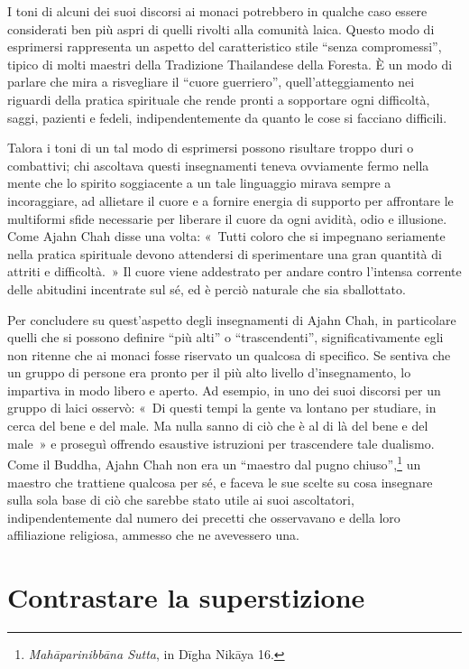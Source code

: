 I toni di alcuni dei suoi discorsi ai monaci potrebbero in qualche caso
essere considerati ben più aspri di quelli rivolti alla comunità laica.
Questo modo di esprimersi rappresenta un aspetto del caratteristico
stile ``senza compromessi'', tipico di molti maestri della Tradizione
Thailandese della Foresta. È un modo di parlare che mira a risvegliare
il ``cuore guerriero'', quell'atteggiamento nei riguardi della pratica
spirituale che rende pronti a sopportare ogni difficoltà, saggi,
pazienti e fedeli, indipendentemente da quanto le cose si facciano
difficili.

Talora i toni di un tal modo di esprimersi possono risultare troppo duri
o combattivi; chi ascoltava questi insegnamenti teneva ovviamente fermo
nella mente che lo spirito soggiacente a un tale linguaggio mirava
sempre a incoraggiare, ad allietare il cuore e a fornire energia di
supporto per affrontare le multiformi sfide necessarie per liberare il
cuore da ogni avidità, odio e illusione. Come Ajahn Chah disse una
volta: «~Tutti coloro che si impegnano seriamente nella pratica
spirituale devono attendersi di sperimentare una gran quantità di
attriti e difficoltà.~» Il cuore viene addestrato per andare contro
l'intensa corrente delle abitudini incentrate sul sé, ed è perciò
naturale che sia sballottato.

Per concludere su quest'aspetto degli insegnamenti di Ajahn Chah, in
particolare quelli che si possono definire ``più alti'' o
``trascendenti'', significativamente egli non ritenne che ai monaci
fosse riservato un qualcosa di specifico. Se sentiva che un gruppo di
persone era pronto per il più alto livello d'insegnamento, lo impartiva
in modo libero e aperto. Ad esempio, in uno dei suoi discorsi per un
gruppo di laici osservò: «~Di questi tempi la gente va lontano per
studiare, in cerca del bene e del male. Ma nulla sanno di ciò che è al
di là del bene e del male~» e proseguì offrendo esaustive istruzioni per
trascendere tale dualismo. Come il Buddha, Ajahn Chah non era un
``maestro dal pugno chiuso'',\footnote{\emph{Mahāparinibbāna Sutta}, in
  Dīgha Nikāya 16.} un maestro che trattiene qualcosa per sé, e
faceva le sue scelte su cosa insegnare sulla sola base di ciò che
sarebbe stato utile ai suoi ascoltatori, indipendentemente dal numero
dei precetti che osservavano e della loro affiliazione religiosa,
ammesso che ne avevessero una.

\section{Contrastare la superstizione}

